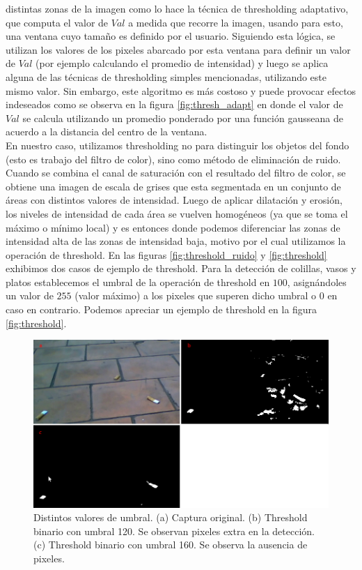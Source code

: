 distintas zonas de la imagen como lo hace la 
técnica de thresholding adaptativo, que computa el valor de $Val$ a 
medida que recorre la imagen, usando para esto, una ventana cuyo 
tamaño es definido por el usuario. Siguiendo esta lógica, se utilizan 
los valores de los pixeles abarcado por esta ventana para definir un valor 
de $Val$ (por ejemplo calculando el promedio de intensidad) y luego se 
aplica alguna de las técnicas de thresholding simples mencionadas, 
utilizando este mismo valor. Sin embargo, este algoritmo es más 
costoso y puede provocar efectos indeseados como se observa en la 
figura \ref{fig:thresh_adapt} en donde el valor de $Val$ se calcula 
utilizando un promedio ponderado por una función gausseana de acuerdo a la distancia del centro 
de la ventana.\\
\indent En nuestro caso, utilizamos thresholding no para distinguir los 
objetos del fondo (esto es trabajo del filtro de color), sino como 
método de eliminación de ruido. Cuando se combina el canal de 
saturación con el resultado del filtro de color, se obtiene una imagen 
de escala de grises que esta segmentada en un conjunto de áreas con 
distintos valores de intensidad. Luego de aplicar dilatación y 
erosión, los niveles de intensidad de cada área se vuelven 
homogéneos (ya que se toma el máximo o mínimo local) y es entonces 
donde podemos diferenciar las zonas de intensidad alta de las zonas de 
intensidad baja, motivo por el cual utilizamos la operación de 
threshold. En las figuras \ref{fig:threshold_ruido} y 
\ref{fig:threshold} exhibimos dos casos de ejemplo de threshold. 
Para la detección de colillas, vasos y platos establecemos 
el umbral de la operación de threshold en $100$, asignándoles un valor 
de $255$ (valor máximo) a los pixeles que superen dicho umbral o $0$ en 
caso en contrario. Podemos apreciar un ejemplo de threshold en la 
figura \ref{fig:threshold}.

\begin{figure}[tpb]
\begin{center}
  \includegraphics[scale=0.4]{figuras/threshold-dif.png}
\end{center}
  \caption{\small Distintos valores de umbral. (a) Captura original. 
  (b) Threshold binario con umbral 120. Se observan pixeles extra en 
  la detección. (c) Threshold binario con umbral 160. Se observa la 
  ausencia de pixeles. }
  \label{fig:thresh-dif}
\end{figure}


